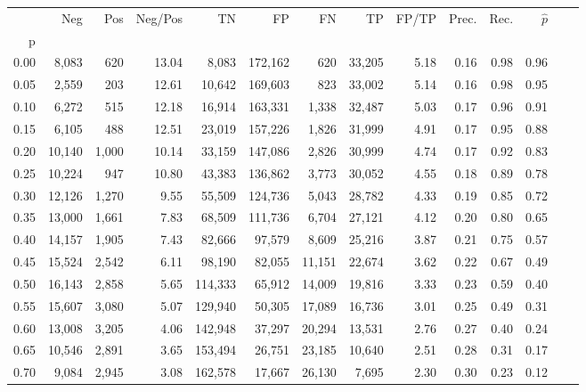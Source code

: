 \begin{tabular}{rrrrrrrrrrrrrr}
\toprule
{} &     Neg &    Pos & Neg/Pos &       TN &       FP &      FN &      TP & FP/TP & Prec. &  Rec. & $\hat{p}$ \\
p    &         &        &         &          &          &         &         &       &       &       &           \\
\midrule
0.00 &   8,083 &    620 &   13.04 &    8,083 &  172,162 &     620 &  33,205 &  5.18 &  0.16 &  0.98 &      0.96 \\
0.05 &   2,559 &    203 &   12.61 &   10,642 &  169,603 &     823 &  33,002 &  5.14 &  0.16 &  0.98 &      0.95 \\
0.10 &   6,272 &    515 &   12.18 &   16,914 &  163,331 &   1,338 &  32,487 &  5.03 &  0.17 &  0.96 &      0.91 \\
0.15 &   6,105 &    488 &   12.51 &   23,019 &  157,226 &   1,826 &  31,999 &  4.91 &  0.17 &  0.95 &      0.88 \\
0.20 &  10,140 &  1,000 &   10.14 &   33,159 &  147,086 &   2,826 &  30,999 &  4.74 &  0.17 &  0.92 &      0.83 \\
0.25 &  10,224 &    947 &   10.80 &   43,383 &  136,862 &   3,773 &  30,052 &  4.55 &  0.18 &  0.89 &      0.78 \\
0.30 &  12,126 &  1,270 &    9.55 &   55,509 &  124,736 &   5,043 &  28,782 &  4.33 &  0.19 &  0.85 &      0.72 \\
0.35 &  13,000 &  1,661 &    7.83 &   68,509 &  111,736 &   6,704 &  27,121 &  4.12 &  0.20 &  0.80 &      0.65 \\
0.40 &  14,157 &  1,905 &    7.43 &   82,666 &   97,579 &   8,609 &  25,216 &  3.87 &  0.21 &  0.75 &      0.57 \\
0.45 &  15,524 &  2,542 &    6.11 &   98,190 &   82,055 &  11,151 &  22,674 &  3.62 &  0.22 &  0.67 &      0.49 \\
0.50 &  16,143 &  2,858 &    5.65 &  114,333 &   65,912 &  14,009 &  19,816 &  3.33 &  0.23 &  0.59 &      0.40 \\
0.55 &  15,607 &  3,080 &    5.07 &  129,940 &   50,305 &  17,089 &  16,736 &  3.01 &  0.25 &  0.49 &      0.31 \\
0.60 &  13,008 &  3,205 &    4.06 &  142,948 &   37,297 &  20,294 &  13,531 &  2.76 &  0.27 &  0.40 &      0.24 \\
0.65 &  10,546 &  2,891 &    3.65 &  153,494 &   26,751 &  23,185 &  10,640 &  2.51 &  0.28 &  0.31 &      0.17 \\
0.70 &   9,084 &  2,945 &    3.08 &  162,578 &   17,667 &  26,130 &   7,695 &  2.30 &  0.30 &  0.23 &      0.12 \\

\end{tabular}
